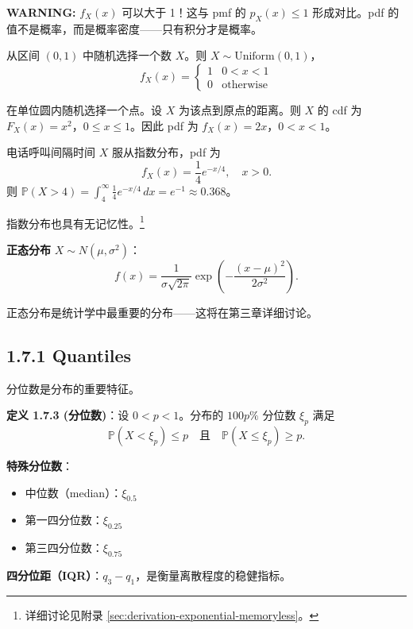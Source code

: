 \textbf{WARNING:} $f_X(x)$ 可以大于 1！这与 pmf 的 $p_X(x) \leq 1$ 形成对比。pdf 的值不是概率，而是概率密度——只有积分才是概率。

\begin{example}[均匀分布]\label{ex:uniform-cont-ch1}
从区间 $(0, 1)$ 中随机选择一个数 $X$。则 $X \sim \text{Uniform}(0, 1)$，
\[
f_X(x) = \begin{cases} 1 & 0 < x < 1 \\ 0 & \text{otherwise} \end{cases}
\]
\end{example}

\begin{example}[单位圆内的随机点]\label{ex:unit-circle-ch1}
在单位圆内随机选择一个点。设 $X$ 为该点到原点的距离。则 $X$ 的 cdf 为 $F_X(x) = x^2$，$0 \leq x \leq 1$。因此 pdf 为 $f_X(x) = 2x$，$0 < x < 1$。
\end{example}

\begin{example}[指数分布]\label{ex:exponential-ch1}
电话呼叫间隔时间 $X$ 服从指数分布，pdf 为
\[
f_X(x) = \frac{1}{4} e^{-x/4}, \quad x > 0.
\]
则 $\mathbb{P}(X > 4) = \int_4^\infty \frac{1}{4} e^{-x/4} \, dx = e^{-1} \approx 0.368$。

指数分布也具有无记忆性。\footnote{详细讨论见附录 \cref{sec:derivation-exponential-memoryless}。}
\end{example}

\textbf{正态分布} $X \sim N(\mu, \sigma^2)$：
\[
f(x) = \frac{1}{\sigma\sqrt{2\pi}} \exp\left(-\frac{(x-\mu)^2}{2\sigma^2}\right).
\tag{1.7.1}\label{eq:normal-pdf-ch1}
\]

正态分布是统计学中最重要的分布——这将在第三章详细讨论。

\subsection{1.7.1 Quantiles}

分位数是分布的重要特征。

\begin{remark}
\textbf{定义 1.7.3 (分位数)}：设 $0 < p < 1$。分布的 $100p\%$ 分位数 $\xi_p$ 满足
\[
\mathbb{P}(X < \xi_p) \leq p \quad \text{且} \quad \mathbb{P}(X \leq \xi_p) \geq p.
\tag{1.7.2}\label{eq:quantile-def-ch1}
\]

\textbf{特殊分位数}：
\begin{itemize}
    \item 中位数（median）：$\xi_{0.5}$
    \item 第一四分位数：$\xi_{0.25}$
    \item 第三四分位数：$\xi_{0.75}$
\end{itemize}

\textbf{四分位距（IQR）}：$q_3 - q_1$，是衡量离散程度的稳健指标。
\end{remark}

